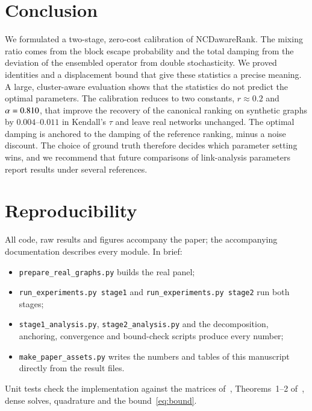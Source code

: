 \documentclass[11pt,a4paper]{article}
\theoremstyle{definition}
\theoremstyle{remark}
\begin{document}
\section{Conclusion}
\label{sec:conclusion}

We formulated a two-stage, zero-cost calibration of NCDawareRank. The mixing ratio comes from the block
escape probability and the total damping from the deviation of the ensembled operator from double
stochasticity. We proved identities and a displacement bound that give these statistics a precise
meaning. A large, cluster-aware evaluation shows that the statistics do not predict the optimal
parameters. The calibration reduces to two constants, $r\approx0.2$ and $\alpha=0.810$, that
improve the recovery of the canonical ranking on synthetic graphs by $0.004$--$0.011$ in Kendall's $\tau$
and leave real networks unchanged. The optimal damping is anchored to the damping of the reference ranking,
minus a noise discount. The choice of ground truth therefore decides which parameter setting wins, and
we recommend that future comparisons of link-analysis parameters report results under several
references.

\section*{Reproducibility}
All code, raw results and figures accompany the paper; the accompanying documentation describes every
module. In brief:
\begin{itemize}[leftmargin=1.4em,itemsep=0pt]
\item \texttt{prepare\_real\_graphs.py} builds the real panel;
\item \texttt{run\_experiments.py stage1} and \texttt{run\_experiments.py stage2} run both stages;
\item \texttt{stage1\_analysis.py}, \texttt{stage2\_analysis.py} and the decomposition, anchoring,
convergence and bound-check scripts produce every number;
\item \texttt{make\_paper\_assets.py} writes the numbers and tables of this manuscript directly from the
result files.
\end{itemize}
Unit tests check the implementation against the matrices of~\cite[Fig.~1]{ng13}, Theorems~1--2
of~\cite{ng13}, dense solves, quadrature and the bound~\eqref{eq:bound}.
\end{document}
